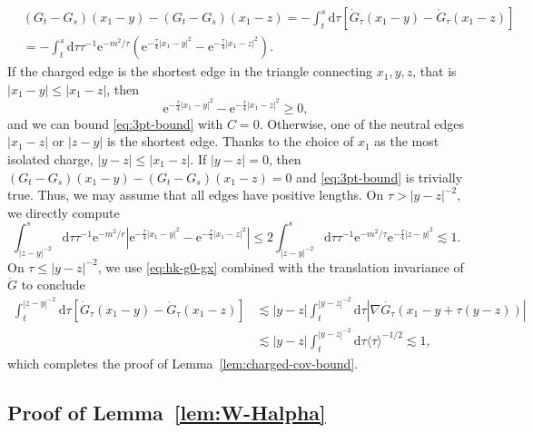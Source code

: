 \documentclass[11pt, a4paper]{scrartcl}
\numberwithin{equation}{section}
\theoremstyle{plain}
\theoremstyle{remark}
\newcommand{\mathd}{\mathrm{d}}
\newcommand{\mathe}{\mathrm{e}}
\begin{document}
\[ \begin{aligned}
		 & (G_t - G_s) (x_1 - y) - (G_t - G_s) (x_1 - z)
		= - \int_t^s \mathd
		\tau [\dot{G}_{\tau} (x_1 - y) - \dot{G}_{\tau} (x_1 - z)]          \\
		 & = - \int_t^s \mathd \tau \tau^{- 1} \mathe^{- m^2 / \tau} \left(
		\mathe^{- \frac{\tau}{4} | x_1 - y |^2} - \mathe^{- \frac{\tau}{4} | x_1 - z
			|^2} \right) .
	\end{aligned} \]
If the charged edge is the shortest edge in the triangle connecting $x_1, y,
	z$, that is $| x_1 - y | \leqslant | x_1 - z |$, then
\[ \mathe^{- \frac{\tau}{4} | x_1 - y |^2} - \mathe^{- \frac{\tau}{4} | x_1 -
		z |^2} \geqslant 0, \]
and we can bound \eqref{eq:3pt-bound} with $C = 0$. Otherwise, one of the
neutral edges $| x_1 - z |$ or $| z - y |$ is the shortest edge. Thanks to the choice of \(x_1\) as the most isolated charge,  $| y - z | \leqslant | x_1 - z |$. If $| y - z | = 0$, then $(G_t - G_s) (x_1 - y) -
	(G_t - G_s) (x_1 - z) = 0$ and \eqref{eq:3pt-bound} is trivially true. Thus,
we may assume that all edges have positive lengths. On $\tau > | y - z |^{-
			2}$, we directly compute
\[ \int^s_{| z - y |^{- 2}} \mathd \tau \tau^{- 1} \mathe^{- m^2 / r} \left|
	\mathe^{- \frac{\tau}{4} | x_1 - y |^2} - \mathe^{- \frac{\tau}{4} | x_1 -
		z |^2} \right| \leqslant 2 \int^s_{| z - y |^{- 2}} \mathd \tau \tau^{- 1}
	\mathe^{- m^2 / \tau} \mathe^{- \frac{\tau}{4} | z - y |^2} \lesssim 1. \]
On $\tau \leqslant | y - z |^{- 2}$, we use \eqref{eq:hk-g0-gx} combined with
the translation invariance of $\dot{G}$ to conclude
\begin{align*}
	\int_t^{| z - y |^{- 2}} \mathd \tau [\dot{G}_{\tau} (x_1 - y) -
		\dot{G}_{\tau} (x_1 - z)]
	 & \lesssim |y-z| \int_t^{| y - z |^{- 2}} \mathd \tau
	|\nabla\dot{G_{\tau}} (x_1 - y + \tau(y-z))| \\
	 & \lesssim | y - z | \int_t^{| y - z |^{-
				2}} \mathd \tau  \langle \tau \rangle^{- 1 / 2} \lesssim 1,
\end{align*}
which completes the proof of Lemma~\ref{lem:charged-cov-bound}.

\subsection{Proof of Lemma~\ref{lem:W-Halpha}}
\end{document}
